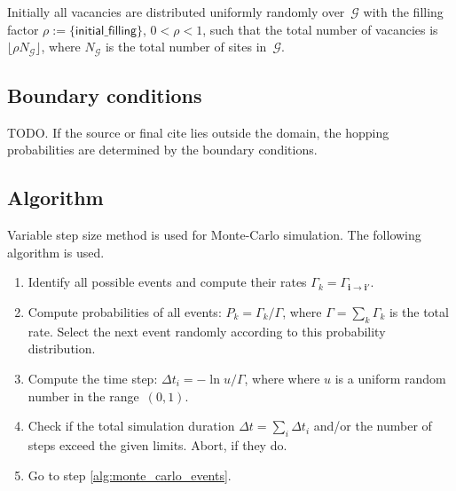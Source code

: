 \documentclass[10pt]{article}
\renewcommand{\vec}[1]{\mathbf{#1}}
\newcommand{\vi}{\vec{i}}
\begin{document}
Initially all vacancies are distributed uniformly randomly over~$\mathcal{G}$
with the filling factor $\rho := \{ \mathsf{initial\_filling} \}$,
$0 < \rho < 1$, such that the total number of vacancies is
$\lfloor \rho N_{\mathcal{G}} \rfloor$, where $N_{\mathcal{G}}$ is the total
number of sites in~$\mathcal{G}$.

\subsection*{Boundary conditions}

TODO. If the source or final cite lies outside the domain, the hopping probabilities are determined by the boundary conditions.

\subsection*{Algorithm}

Variable step size method is used for Monte-Carlo simulation. The following
algorithm is used.

\begin{enumerate}
\item \label{alg:monte_carlo_events} Identify all possible events and compute
their rates $\Gamma_k = \Gamma_{\vi \to \vi'}$.

\item Compute probabilities of all events: $P_k = \Gamma_k / \Gamma$, where
$\Gamma = \sum_k \Gamma_k$ is the total rate. Select the next event randomly
according to this probability distribution.

\item Compute the time step: $\Delta t_i = -\ln u / \Gamma$, where where $u$
is a uniform random number in the range~$(0, 1)$.

\item Check if the total simulation duration $\Delta t = \sum_i \Delta t_i$
and/or the number of steps exceed the given limits. Abort, if they do.

\item Go to step \ref{alg:monte_carlo_events}.
\end{enumerate}


\end{document}
